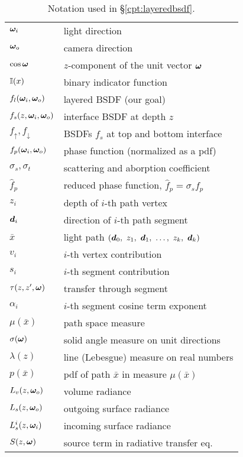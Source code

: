 \begin{table}[h]
	\centering
	\caption[Notation used in \S\ref{cpt:layeredbsdf}]{\label{tab:layeredbsdf:notation}
		Notation used in \S\ref{cpt:layeredbsdf}.
	}
	\renewcommand{\arraystretch}{1.1}
	\begin{tabular}{ll}
		$\bm{\omega}_i$ & light direction \\
		$\bm{\omega}_o$ & camera direction \\
		$\cos \bm{\omega}$ & $z$-component of the unit vector $\bm{\omega}$ \\
		$\mathbb{I}(x)$ & binary indicator function \\
		\hline
		
		$f_l(\bm{\omega}_i, \bm{\omega}_o)$ & layered BSDF (our goal) \\
		$f_s(z, \bm{\omega}_i, \bm{\omega}_o)$ & interface BSDF at depth $z$ \\
		$f_\uparrow, f_\downarrow$ & BSDFs $f_s$ at top and bottom interface \\
		$f_p(\bm{\omega}_i, \bm{\omega}_o)$ & phase function (normalized as a pdf) \\
		$\sigma_s, \sigma_t$ & scattering and aborption coefficient \\
		$\hat f_p$ & reduced phase function, $\hat f_p = \sigma_s f_p$ \\
		\hline
		
		$z_i$ & depth of $i$-th path vertex \\
		$\bm{d}_i$ & direction of $i$-th path segment \\
		$\bar x$ & light path $(\bd_0,\ z_1,\ \bd_1,\ \dots,\ z_k,\ \bd_k)$ \\
		$v_i$ & $i$-th vertex contribution \\
		$s_i$ & $i$-th segment contribution \\
		$\tau(z, z', \bm{\omega})$ & transfer through segment \\
		$\alpha_i$ & $i$-th segment cosine term exponent \\
		$\mu(\bar x)$ & path space measure \\
		$\sigma(\bm{\omega})$ & solid angle measure on unit directions \\
		$\lambda(z)$ & line (Lebesgue) measure on real numbers \\
		$p(\bar x)$ & pdf of path $\bar x$ in measure $\mu(\bar x)$ \\
		\hline
		
		$L_v(z, \bm{\omega}_o)$ & volume radiance \\
		$L_s(z, \bm{\omega}_o)$ & outgoing surface radiance \\
		$L^i_s(z, \bm{\omega}_i)$ & incoming surface radiance \\
		$S(z, \bm{\omega})$ & source term in radiative transfer eq. \\
	\end{tabular}
\end{table}
